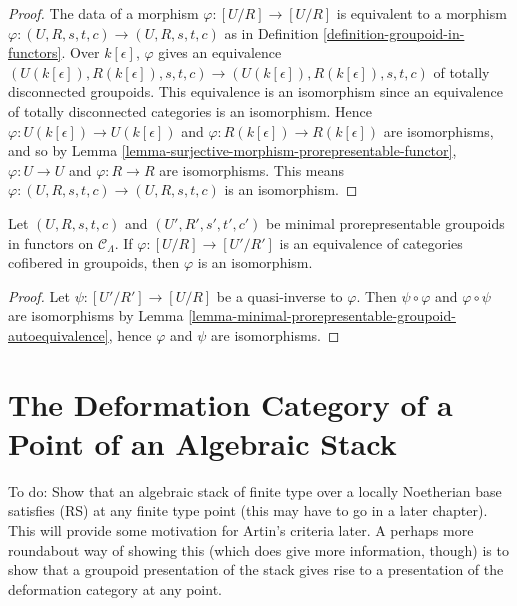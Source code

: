 \begin{proof}
The data of a morphism $\varphi: [U/R] \to [U/R]$ is equivalent to a 
morphism $\varphi: (U,R,s,t,c) \to (U,R,s,t,c)$ as in Definition 
\ref{definition-groupoid-in-functors}.  Over $k[\epsilon]$, $\varphi$ gives 
an equivalence $(U(k[\epsilon]),R(k[\epsilon]), s,t,c) \to 
(U(k[\epsilon]),R(k[\epsilon]), s,t,c)$ of totally disconnected 
groupoids.  This equivalence is an isomorphism since an equivalence of totally 
disconnected categories is an isomorphism. Hence $\varphi: U(k[\epsilon]) 
\to U(k[\epsilon])$ and $\varphi: R(k[\epsilon]) \to 
R(k[\epsilon])$ are isomorphisms, and so by Lemma 
\ref{lemma-surjective-morphism-prorepresentable-functor}, $\varphi: U 
\to U$ and $\varphi: R \to R$ are isomorphisms.  This means 
$\varphi: (U,R,s,t,c) \to (U,R,s,t,c)$ is an isomorphism.
\end{proof}

\begin{lemma}
\label{lemma-minimal-prorepresentable-groupoid-equivalence}
Let $(U,R,s,t,c)$ and $(U',R',s',t',c')$ be minimal prorepresentable groupoids 
in functors on $\mathcal{C}_\Lambda$.  If $\varphi: [U/R] \to [U'/R']$ 
is an equivalence of categories cofibered in groupoids, then $\varphi$ is an 
isomorphism. 
\end{lemma}

\begin{proof}
Let $\psi: [U'/R'] \to [U/R]$ be a quasi-inverse to $\varphi$.  Then 
$\psi \circ \varphi$ and $\varphi \circ \psi$ are isomorphisms by Lemma 
\ref{lemma-minimal-prorepresentable-groupoid-autoequivalence}, hence $\varphi$ 
and $\psi$ are isomorphisms.
\end{proof}










\section{The Deformation Category of a Point of an Algebraic Stack} 
\label{section-algebraic-stacks}

\noindent
To do: Show that an algebraic stack of finite type over a locally Noetherian
base satisfies (RS) at any finite type point (this may have to go in a later
chapter). This will provide some motivation for Artin's criteria later.
A perhaps more roundabout  way of showing this (which does give more
information, though) is to show that a groupoid presentation of the stack
gives rise to a presentation of the deformation category at any point.




